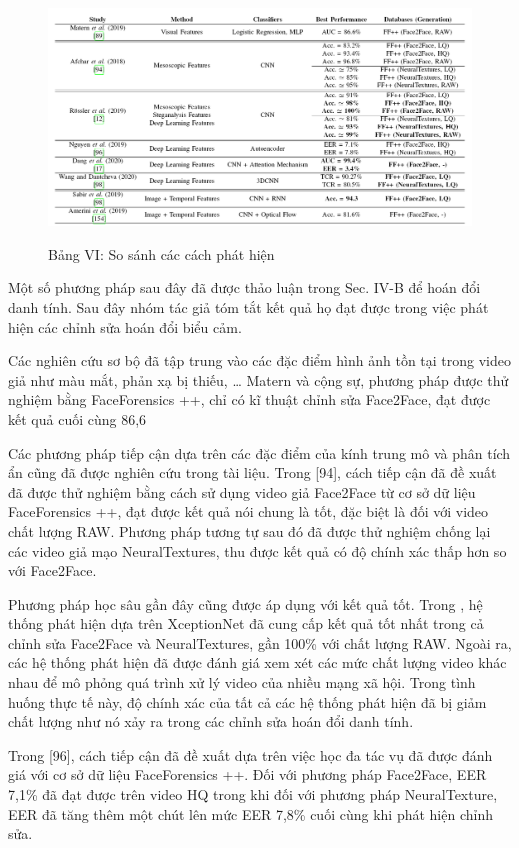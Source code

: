 \documentclass{article}
\begin{document}
\begin{figure}[h!]
\caption{Bảng VI: So sánh các cách phát hiện}
\includegraphics[width=\columnwidth]{table-6-compare}
\label{table-6-compare}
\end{figure}

Một số phương pháp sau đây đã được thảo luận trong Sec. IV-B để hoán đổi danh tính. Sau đây nhóm tác giả tóm tắt kết quả họ đạt được trong việc phát hiện các chỉnh sửa hoán đổi biểu cảm.

Các nghiên cứu sơ bộ đã tập trung vào các đặc điểm hình ảnh tồn tại trong video giả như màu mắt, phản xạ bị thiếu, … Matern và cộng sự, phương pháp được thử nghiệm bằng FaceForensics ++, chỉ có kĩ thuật chỉnh sửa Face2Face, đạt được kết quả cuối cùng 86,6%

Các phương pháp tiếp cận dựa trên các đặc điểm của kính trung mô và phân tích ẩn cũng đã được nghiên cứu trong tài liệu. Trong [94], cách tiếp cận đã đề xuất đã được thử nghiệm bằng cách sử dụng video giả Face2Face từ cơ sở dữ liệu FaceForensics ++, đạt được kết quả nói chung là tốt, đặc biệt là đối với video chất lượng RAW. Phương pháp tương tự sau đó đã được thử nghiệm chống lại các video giả mạo NeuralTextures, thu được kết quả có độ chính xác thấp hơn so với Face2Face.

Phương pháp học sâu gần đây cũng được áp dụng với kết quả tốt. Trong , hệ thống phát hiện dựa trên XceptionNet đã cung cấp kết quả tốt nhất trong cả chỉnh sửa Face2Face và NeuralTextures, gần 100\% với chất lượng RAW. Ngoài ra, các hệ thống phát hiện đã được đánh giá xem xét các mức chất lượng video khác nhau để mô phỏng quá trình xử lý video của nhiều mạng xã hội. Trong tình huống thực tế này, độ chính xác của tất cả các hệ thống phát hiện đã bị giảm chất lượng như nó xảy ra trong các chỉnh sửa hoán đổi danh tính.

Trong [96], cách tiếp cận đã đề xuất dựa trên việc học đa tác vụ đã được đánh giá với cơ sở dữ liệu FaceForensics ++. Đối với phương pháp Face2Face, EER 7,1\% đã đạt được trên video HQ trong khi đối với phương pháp NeuralTexture, EER đã tăng thêm một chút lên mức EER 7,8\% cuối cùng khi phát hiện chỉnh sửa.
\end{document}
